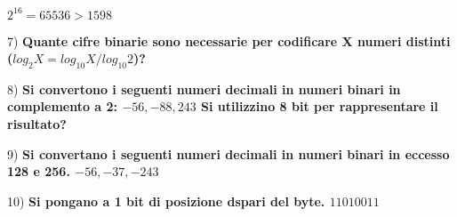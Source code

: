\documentclass[a4paper, 12pt]{article} %
\begin{document}
$ 2^{16} = 65536 > 1598 $ \break

\textsf{\large{\color{red} 7) \textbf{\normalcolor Quante cifre binarie sono necessarie per codificare X numeri distinti ($log_2 X = log_{10} X / log_{10} 2$)?}}} \break

\textsf{\large{\color{red} 8) \textbf{\normalcolor Si convertono i seguenti numeri decimali in numeri binari in complemento a 2: $-56, -88, 243$ Si utilizzino 8 bit per rappresentare il risultato?}}} \break

\textsf{\large{\color{red} 9) \textbf{\normalcolor Si convertano i seguenti numeri decimali in numeri binari in eccesso 128 e 256. $-56, -37, -243$}}} \break


\textsf{\large{\color{red} 10) \textbf{\normalcolor Si pongano a 1 bit di posizione dspari del byte. $11010011$}}} \\

\newcommand{\AND}{\text{\textrm{\color{red}{AND}}}}
\newcommand{\OR}{\text{\textsl{\color{red}{OR}}}}
\end{document}
